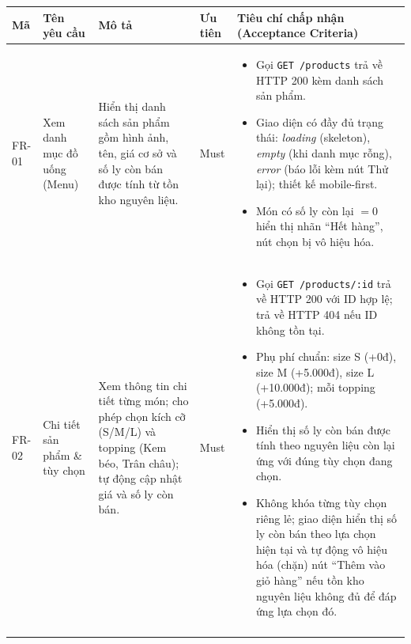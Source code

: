 \begin{longtable}{@{}p{1.2cm}p{2.6cm}p{4.2cm}p{1.4cm}p{6.6cm}@{}}
\toprule
\textbf{Mã} & \textbf{Tên yêu cầu} & \textbf{Mô tả} & \textbf{Ưu tiên} & \textbf{Tiêu chí chấp nhận (Acceptance Criteria)} \\
\midrule
\endhead

FR-01 & Xem danh mục đồ uống (Menu)
  & Hiển thị danh sách sản phẩm gồm hình ảnh, tên, giá cơ sở và số ly còn bán được tính từ tồn kho nguyên liệu.
  & Must
  & \begin{itemize}[leftmargin=*]
      \item Gọi \texttt{GET /products} trả về HTTP 200 kèm danh sách sản phẩm.
      \item Giao diện có đầy đủ trạng thái: \emph{loading} (skeleton), \emph{empty} (khi danh mục rỗng), \emph{error} (báo lỗi kèm nút Thử lại); thiết kế mobile-first.
      \item Món có số ly còn lại $= 0$ hiển thị nhãn ``Hết hàng'', nút chọn bị vô hiệu hóa.
    \end{itemize} \\
\addlinespace

FR-02 & Chi tiết sản phẩm \& tùy chọn
  & Xem thông tin chi tiết từng món; cho phép chọn kích cỡ (S/M/L) và topping (Kem béo, Trân châu); tự động cập nhật giá và số ly còn bán.
  & Must
  & \begin{itemize}[leftmargin=*]
      \item Gọi \texttt{GET /products/:id} trả về HTTP 200 với ID hợp lệ; trả về HTTP 404 nếu ID không tồn tại.
      \item Phụ phí chuẩn: size S (+0đ), size M (+5.000đ), size L (+10.000đ); mỗi topping (+5.000đ).
      \item Hiển thị số ly còn bán được tính theo nguyên liệu còn lại ứng với đúng tùy chọn đang chọn.
      \item Không khóa từng tùy chọn riêng lẻ; giao diện hiển thị số ly còn bán theo lựa chọn hiện tại và tự động vô hiệu hóa (chặn) nút ``Thêm vào giỏ hàng'' nếu tồn kho nguyên liệu không đủ để đáp ứng lựa chọn đó.
    \end{itemize} \\
\addlinespace


\end{longtable}

